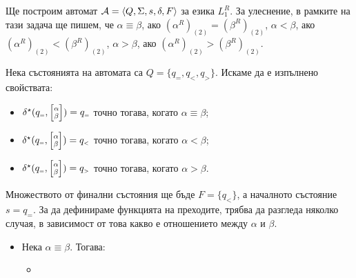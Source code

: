 \begin{hint}
  Ще построим автомат $\mathcal{A} = \langle{Q,\Sigma,s,\delta,F}\rangle$ за езика $L^R_1$.
  За улеснение, в рамките на тази задача ще пишем, че $\alpha \equiv \beta$, ако $(\alpha^R)_{(2)} = (\beta^R)_{(2)}$,
  $\alpha < \beta$, ако $(\alpha^R)_{(2)} < (\beta^R)_{(2)}$,
  $\alpha > \beta$, ако $(\alpha^R)_{(2)} > (\beta^R)_{(2)}$.

  Нека състоянията на автомата са $Q = \{q_{\scriptscriptstyle{=}},q_{\scriptscriptstyle{<}},q_{\scriptscriptstyle{>}}\}$.
  Искаме да е изпълнено свойствата:
  \begin{itemize}
  \item 
    $\delta^\star(q_{\scriptscriptstyle{=}}, \scriptsize{\begin{bmatrix} \alpha\\ \beta\end{bmatrix}}) = q_{\scriptscriptstyle{=}}$ точно тогава, когато $\alpha \equiv \beta$;
  \item 
    $\delta^\star(q_{\scriptscriptstyle{=}}, \scriptsize{\begin{bmatrix} \alpha\\ \beta\end{bmatrix}}) = q_{\scriptscriptstyle{<}}$ точно тогава, когато $\alpha < \beta$;
  \item 
    $\delta^\star(q_{\scriptscriptstyle{=}}, \scriptsize{\begin{bmatrix} \alpha\\ \beta\end{bmatrix}}) = q_{\scriptscriptstyle{>}}$ точно тогава, когато $\alpha > \beta$.
  \end{itemize}
  Множеството от финални състояния ще бъде $F = \{q_{\scriptscriptstyle{<}}\}$, а началното състояние $s = q_{\scriptscriptstyle{=}}$.
  За да дефинираме функцията на преходите, трябва да разгледа няколко случая, в зависимост от това какво е отношението между $\alpha$ и $\beta$.
  \begin{itemize}
  \item
    Нека $\alpha \equiv \beta$. Тогава:  
    \begin{itemize}
    \item 

\end{itemize}
\end{itemize}
\end{hint}
